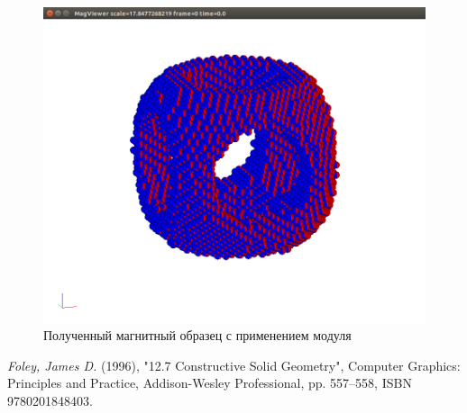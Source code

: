 \begin{figure}
    \begin{center}
        \includegraphics[width=12cm]{images/my_Csg_tree.png}
    \end{center}
    \caption{Полученный магнитный образец с применением модуля}
    \label{img:mycsg}
\end{figure}


\newpage
\begin{thebibliography}{9}
     \textit{Foley, James D.} (1996), "12.7 Constructive Solid Geometry", Computer Graphics: Principles and Practice, Addison-Wesley Professional, pp. 557–558, ISBN 9780201848403.
\end{thebibliography}
